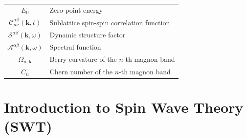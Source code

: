 \documentclass[aps, prx, nofootinbib, superscriptaddress]{revtex4-2}
\begin{document}
\begin{table}[t]
\begin{tabular}{c|l}
    $E_0$ & Zero-point energy \\
    $\mathcal{C}^{\alpha\beta}_{\mu\nu}(\mathbf{k}, t)$ & Sublattice spin-spin correlation function \\
    $\mathcal{S}^{\alpha\beta}(\mathbf{k}, \omega)$ & Dynamic structure factor \\
    $\mathcal{A}^{\alpha\beta}(\mathbf{k}, \omega)$ & Spectral function \\
    $\Omega_{n,\mathbf{k}}$ & Berry curvature of the $n$-th magnon band \\
    $C_n$ & Chern number of the $n$-th magnon band \\
    \hline
    \end{tabular}
\end{table}


\newpage
\section{Introduction to Spin Wave Theory (SWT)}
\end{document}
